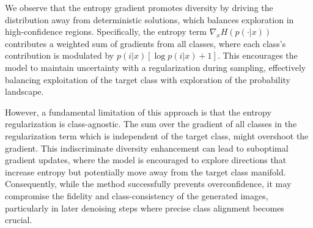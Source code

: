 \documentclass{article}
\begin{document}
We observe that the entropy gradient promotes diversity by driving the distribution away from deterministic solutions, which balances exploration in high-confidence regions. Specifically, the entropy term $\nabla_xH(p(\cdot|x))$ contributes a weighted sum of gradients from all classes, where each class's contribution is modulated by $ p(i|x) \left[\log p(i|x) + 1\right]$. This encourages the model to maintain uncertainty with a regularization during sampling, effectively balancing exploitation of the target class with exploration of the probability landscape.


However, a fundamental limitation of this approach is that the entropy regularization is class-agnostic. The sum over the gradient of all classes in the regularization term which is independent of the target class, might overshoot the gradient. This indiscriminate diversity enhancement can lead to suboptimal gradient updates, where the model is encouraged to explore directions that increase entropy but potentially move away from the target class manifold. Consequently, while the method successfully prevents overconfidence, it may compromise the fidelity and class-consistency of the generated images, particularly in later denoising steps where precise class alignment becomes crucial. 
\end{document}

